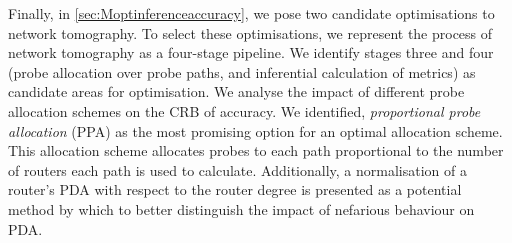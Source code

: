 Finally, in \cref{sec:Moptinferenceaccuracy}, we pose two candidate optimisations to network tomography. To select these optimisations, we represent the process of network tomography as a four-stage pipeline. We identify stages three and four (probe allocation over probe paths, and inferential calculation of metrics) as candidate areas for optimisation. We analyse the impact of different probe allocation schemes on the CRB of accuracy. We identified, \textit{proportional probe allocation} (PPA) as the most promising option for an optimal allocation scheme. This allocation scheme allocates probes to each path proportional to the number of routers each path is used to     calculate. Additionally, a normalisation of a router's PDA with respect to the router degree is presented as a potential method by which to better distinguish the impact of nefarious behaviour on PDA.\par